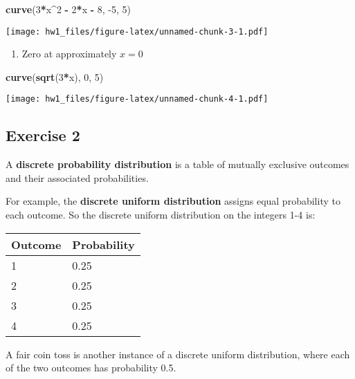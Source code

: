 \documentclass[
]{article}
\newenvironment{Shaded}{\begin{snugshade}}{\end{snugshade}}
\newcommand{\DecValTok}[1]{\textcolor[rgb]{0.00,0.00,0.81}{#1}}
\newcommand{\KeywordTok}[1]{\textcolor[rgb]{0.13,0.29,0.53}{\textbf{#1}}}
\newcommand{\NormalTok}[1]{#1}
\newcommand{\OperatorTok}[1]{\textcolor[rgb]{0.81,0.36,0.00}{\textbf{#1}}}
\newcommand{\StringTok}[1]{\textcolor[rgb]{0.31,0.60,0.02}{#1}}
\providecommand{\tightlist}{%
  \setlength{\itemsep}{0pt}\setlength{\parskip}{0pt}}
\begin{document}
\begin{Shaded}
\begin{Highlighting}[]
\KeywordTok{curve}\NormalTok{(}\DecValTok{3}\OperatorTok{*}\NormalTok{x}\OperatorTok{\^{}}\DecValTok{2} \OperatorTok{{-}}\StringTok{ }\DecValTok{2}\OperatorTok{*}\NormalTok{x }\OperatorTok{{-}}\StringTok{ }\DecValTok{8}\NormalTok{, }\DecValTok{{-}5}\NormalTok{, }\DecValTok{5}\NormalTok{)}
\end{Highlighting}
\end{Shaded}

\texttt{[image: hw1\_files/figure-latex/unnamed-chunk-3-1.pdf]}

\begin{enumerate}
\def\labelenumi{\arabic{enumi}.}
\setcounter{enumi}{2}
\tightlist
\item
  Zero at approximately \(x = 0\)
\end{enumerate}

\begin{Shaded}
\begin{Highlighting}[]
\KeywordTok{curve}\NormalTok{(}\KeywordTok{sqrt}\NormalTok{(}\DecValTok{3}\OperatorTok{*}\NormalTok{x), }\DecValTok{0}\NormalTok{, }\DecValTok{5}\NormalTok{)}
\end{Highlighting}
\end{Shaded}

\texttt{[image: hw1\_files/figure-latex/unnamed-chunk-4-1.pdf]}

\hypertarget{exercise-2}{%
\subsection{Exercise 2}\label{exercise-2}}

A \textbf{discrete probability distribution} is a table of mutually
exclusive outcomes and their associated probabilities.

For example, the \textbf{discrete uniform distribution} assigns equal
probability to each outcome. So the discrete uniform distribution on the
integers 1-4 is:

\begin{longtable}[]{@{}ll@{}}
\toprule
Outcome & Probability\tabularnewline
\midrule
\endhead
1 & 0.25\tabularnewline
2 & 0.25\tabularnewline
3 & 0.25\tabularnewline
4 & 0.25\tabularnewline
\bottomrule
\end{longtable}

A fair coin toss is another instance of a discrete uniform distribution,
where each of the two outcomes has probability 0.5.
\end{document}
